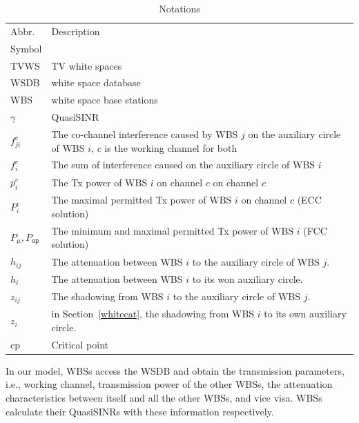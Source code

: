 \documentclass[times]{ettauth}
\newcommand{\ie}{i.e., }
\theoremstyle{mytheoremstyle}
\theoremstyle{mytheoremstyle}
\theoremstyle{mytheoremstyle}
\begin{document}
\begin{table}[h]
\caption{Notations}
\label{tab1}
\centering
\begin{tabular}{l p{5.5cm}}
\toprule
Abbr. & Description \\
Symbol & \\
\midrule
TVWS & TV white spaces\\
WSDB & white space database\\
WBS & white space base stations\\
$\gamma$ & QuasiSINR\\
$f_{ji}^c$  & The co-channel interference caused by WBS $j$ on the auxiliary circle of WBS $i$, $c$ is the working channel for both\\
$f_i^c$ & The sum of interference caused on the auxiliary circle of WBS $i$ \\
$p_i^c$		& The Tx power of WBS $i$ on channel $c$ on channel $c$\\
$P_i^c$		& The maximal permitted Tx power of WBS $i$ on channel $c$ (ECC solution)\\
$P_\mu, P_{\mathtt{op}}$		& The minimum and maximal permitted Tx power of WBS $i$ (FCC solution)\\
$h_{ij}$ & The attenuation between WBS $i$ to the auxiliary circle of WBS $j$.\\
$h_{i}$ & The attenuation between WBS $i$ to its won auxiliary circle.\\
$z_{ij}$ & The shadowing from WBS $i$ to the auxiliary circle of WBS $j$.\\
$z_{i}$ & in Section~\ref{whitecat}, the shadowing from WBS $i$ to its own auxiliary circle.\\
$\text{cp}$ & Critical point\\
\bottomrule
\end{tabular}
\end{table}



In our model, WBSs access the WSDB and obtain the transmission parameters, \ie working channel, transmission power of the other WBSs, the attenuation characteristics between itself and all the other WBSs, and vice visa. 
WBSs calculate their QuasiSINRs with these information respectively.
\end{document}
